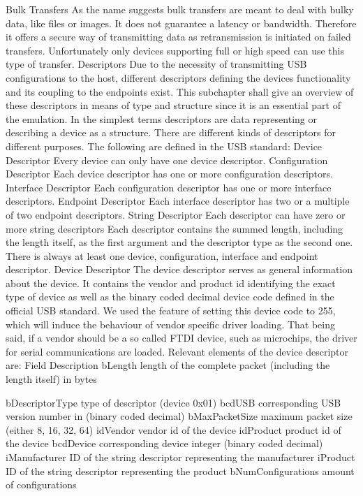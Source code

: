 Bulk Transfers
As the name suggests bulk transfers are meant to deal with bulky data, like files or images. It does not guarantee a latency or bandwidth. Therefore it offers a secure way of transmitting data as retransmission is initiated on failed transfers. Unfortunately only devices supporting full or high speed can use this type of transfer. 
Descriptors
Due to the necessity of transmitting USB configurations to the host, different descriptors defining the devices functionality and its coupling to the endpoints exist. This subchapter shall give an overview of these descriptors in means of type and structure since it is an essential part of the emulation. 
In the simplest terms descriptors are data representing or describing a device as a structure. There are different kinds of descriptors for different purposes. The following are defined in the USB standard:
Device Descriptor
Every device can only have one device descriptor.
Configuration Descriptor
Each device descriptor has one or more configuration descriptors.
Interface Descriptor
Each configuration descriptor has one or more interface descriptors.
Endpoint  Descriptor
Each interface descriptor has two or a multiple of two endpoint descriptors.
String  Descriptor
Each descriptor can have zero or more string descriptors
Each descriptor contains the summed length, including the length itself, as the first argument and the descriptor type as the second one. There is always at least one device, configuration, interface and endpoint descriptor.
Device Descriptor
The device descriptor serves as general information about the device. It contains the vendor and product id identifying the exact type of device as well as the binary coded decimal device code defined in the official USB standard. We used the feature of setting this device code to 255, which will induce the behaviour of vendor specific driver loading. That being said, if a vendor should be a so called FTDI device, such as microchips, the driver for serial communications are loaded. Relevant elements of the device descriptor are: 
Field
Description
bLength
length of the complete packet (including the length itself) in bytes


bDescriptorType
type of descriptor (device 0x01)
bcdUSB
corresponding USB version number in (binary coded decimal)
bMaxPacketSize
maximum packet size (either 8, 16, 32, 64)
idVendor
vendor id of the device
idProduct
product id of the device
bcdDevice
corresponding device integer (binary coded decimal)
iManufacturer
ID of the string descriptor representing the manufacturer
iProduct
ID of the string descriptor representing the product
bNumConfigurations
amount of configurations



